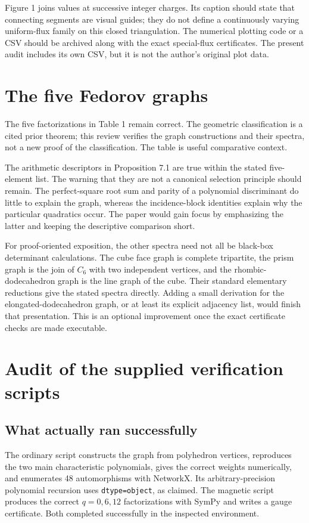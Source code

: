 \documentclass[11pt,a4paper]{article}
\begin{document}
Figure 1 joins values at successive integer charges. Its caption should state that connecting segments are visual guides; they do not define a continuously varying uniform-flux family on this closed triangulation. The numerical plotting code or a CSV should be archived along with the exact special-flux certificates. The present audit includes its own CSV, but it is not the author's original plot data.

\section{The five Fedorov graphs}
The five factorizations in Table 1 remain correct. The geometric classification is a cited prior theorem; this review verifies the graph constructions and their spectra, not a new proof of the classification. The table is useful comparative context.

The arithmetic descriptors in Proposition 7.1 are true within the stated five-element list. The warning that they are not a canonical selection principle should remain. The perfect-square root sum and parity of a polynomial discriminant do little to explain the graph, whereas the incidence-block identities explain why the particular quadratics occur. The paper would gain focus by emphasizing the latter and keeping the descriptive comparison short.

For proof-oriented exposition, the other spectra need not all be black-box determinant calculations. The cube face graph is complete tripartite, the prism graph is the join of $C_6$ with two independent vertices, and the rhombic-dodecahedron graph is the line graph of the cube. Their standard elementary reductions give the stated spectra directly. Adding a small derivation for the elongated-dodecahedron graph, or at least its explicit adjacency list, would finish that presentation. This is an optional improvement once the exact certificate checks are made executable.

\section{Audit of the supplied verification scripts}\label{sec:software}
\subsection{What actually ran successfully}
The ordinary script constructs the graph from polyhedron vertices, reproduces the two main characteristic polynomials, gives the correct weights numerically, and enumerates 48 automorphisms with NetworkX. Its arbitrary-precision polynomial recursion uses \texttt{dtype=object}, as claimed. The magnetic script produces the correct $q=0,6,12$ factorizations with SymPy and writes a gauge certificate. Both completed successfully in the inspected environment.
\end{document}
